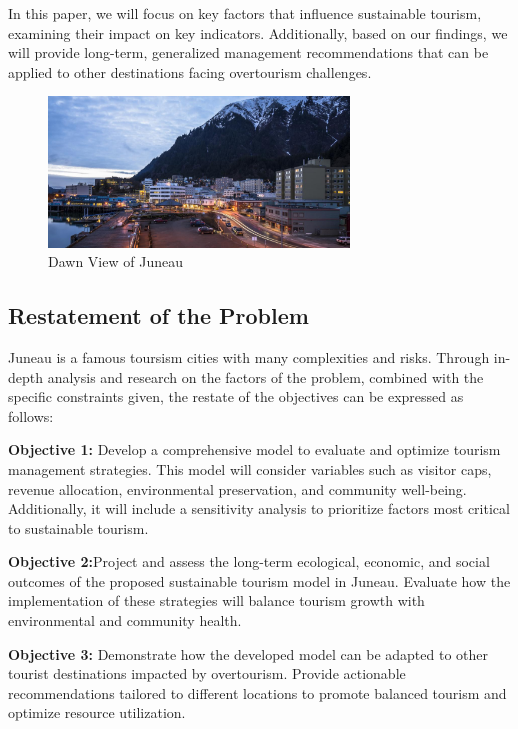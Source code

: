 \documentclass[UTF8]{mcmthesis}
\begin{document}
            In this paper, we will focus on key factors that influence sustainable tourism, examining their impact on key indicators. Additionally, based on our findings, we will provide long-term, generalized management recommendations that can be applied to other destinations facing overtourism challenges.

            \begin{figure}[htbp]
                \centering
                \includegraphics[width=8cm]{figure1.png}
                \caption{Dawn View of Juneau}
            \end{figure}
        
        \subsection{Restatement of the Problem}
        \hspace*{2em}Juneau is a famous toursism cities with many complexities and risks. Through in-depth analysis and research on the factors of the problem, combined with the specific constraints given, the restate of the objectives can be expressed as follows:


   
           \textbf{Objective 1:} Develop a comprehensive model to evaluate and optimize tourism management strategies. This model will consider variables such as visitor caps, revenue allocation, environmental preservation, and community well-being. Additionally, it will include a sensitivity analysis to prioritize factors most critical to sustainable tourism.

            
           \textbf{Objective 2:}Project and assess the long-term ecological, economic, and social outcomes of the proposed sustainable tourism model in Juneau. Evaluate how the implementation of these strategies will balance tourism growth with environmental and community health.

           
           \textbf{Objective 3:} Demonstrate how the developed model can be adapted to other tourist destinations impacted by overtourism. Provide actionable recommendations tailored to different locations to promote balanced tourism and optimize resource utilization.
           
\end{document}
